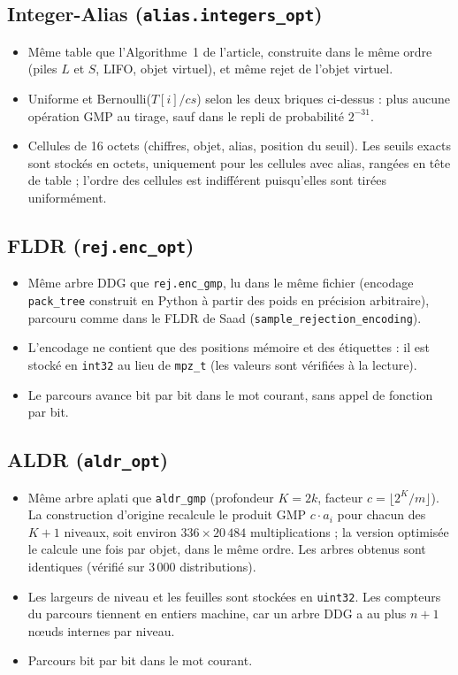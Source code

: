 \documentclass[11pt,a4paper]{article}
\newcommand{\code}[1]{\texttt{#1}}
\newcommand{\cs}{\mathit{cs}}
\begin{document}
\subsection{Integer-Alias (\code{alias.integers\_opt})}
\begin{itemize}
\item Même table que l'Algorithme~1 de l'article, construite dans le même ordre
  (piles $L$ et $S$, LIFO, objet virtuel), et même rejet de l'objet virtuel.
\item Uniforme et Bernoulli($T[i]/\cs$) selon les deux briques ci-dessus : plus aucune
  opération GMP au tirage, sauf dans le repli de probabilité $2^{-31}$.
\item Cellules de 16 octets (chiffres, objet, alias, position du seuil). Les seuils
  exacts sont stockés en octets, uniquement pour les cellules avec alias, rangées en
  tête de table ; l'ordre des cellules est indifférent puisqu'elles sont tirées
  uniformément.
\end{itemize}

\subsection{FLDR (\code{rej.enc\_opt})}
\begin{itemize}
\item Même arbre DDG que \code{rej.enc\_gmp}, lu dans le même fichier (encodage
  \code{pack\_tree} construit en Python à partir des poids en précision arbitraire),
  parcouru comme dans le FLDR de Saad (\code{sample\_rejection\_encoding}).
\item L'encodage ne contient que des positions mémoire et des étiquettes : il est stocké
  en \code{int32} au lieu de \code{mpz\_t} (les valeurs sont vérifiées à la lecture).
\item Le parcours avance bit par bit dans le mot courant, sans appel de fonction par bit.
\end{itemize}

\subsection{ALDR (\code{aldr\_opt})}
\begin{itemize}
\item Même arbre aplati que \code{aldr\_gmp} (profondeur $K = 2k$, facteur
  $c = \lfloor 2^K/m \rfloor$). La construction d'origine recalcule le produit GMP
  $c\cdot a_i$ pour chacun des $K+1$ niveaux, soit environ $336 \times 20\,484$
  multiplications ; la version optimisée le calcule une fois par objet, dans le même
  ordre. Les arbres obtenus sont identiques (vérifié sur 3\,000 distributions).
\item Les largeurs de niveau et les feuilles sont stockées en \code{uint32}. Les
  compteurs du parcours tiennent en entiers machine, car un arbre DDG a au plus $n+1$
  nœuds internes par niveau.
\item Parcours bit par bit dans le mot courant.
\end{itemize}
\end{document}
